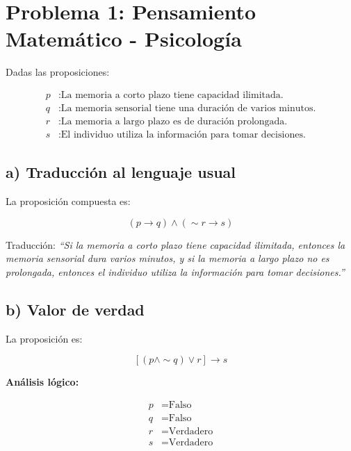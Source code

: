 \documentclass{article}
\begin{document}
	
	\section*{Problema 1: Pensamiento Matemático - Psicología}
	
	Dadas las proposiciones:
	
	
	\[
	\begin{aligned}
		p &: \text{La memoria a corto plazo tiene capacidad ilimitada.} \\
		q &: \text{La memoria sensorial tiene una duración de varios minutos.} \\
		r &: \text{La memoria a largo plazo es de duración prolongada.} \\
		s &: \text{El individuo utiliza la información para tomar decisiones.}
	\end{aligned}
	\]
	
	
	
	\subsection*{a) Traducción al lenguaje usual}
	
	La proposición compuesta es:
	
	
	\[
	(p \to q) \land (\sim r \to s)
	\]
	
	
	
	Traducción:  
	\textit{“Si la memoria a corto plazo tiene capacidad ilimitada, entonces la memoria sensorial dura varios minutos, y si la memoria a largo plazo no es prolongada, entonces el individuo utiliza la información para tomar decisiones.”}
	
	\subsection*{b) Valor de verdad}
	
	La proposición es:
	
	
	\[
	[(p \land \sim q) \lor r] \to s
	\]
	
	
	
	\textbf{Análisis lógico:}
	
	
	\[
	\begin{aligned}
		p &= \text{Falso} \\
		q &= \text{Falso} \\
		r &= \text{Verdadero} \\
		s &= \text{Verdadero}
	\end{aligned}
	\]
	
	
	
\end{document}
